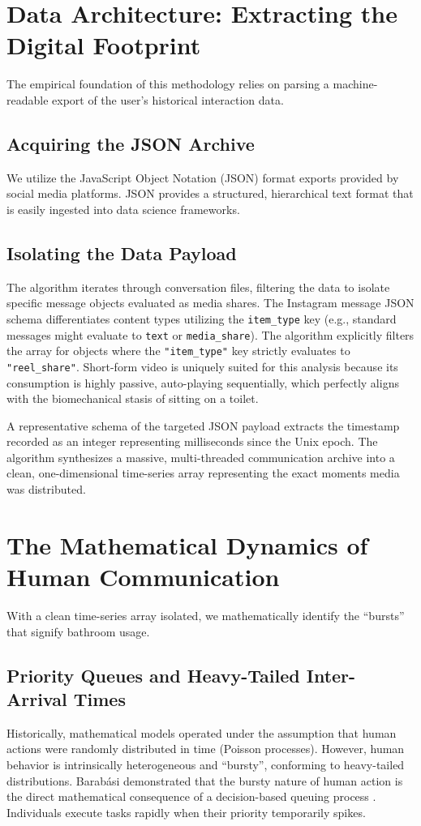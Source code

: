 \documentclass[twocolumn]{article}
\begin{document}
\section{Data Architecture: Extracting the Digital Footprint}
The empirical foundation of this methodology relies on parsing a machine-readable export of the user's historical interaction data.

\subsection{Acquiring the JSON Archive}
We utilize the JavaScript Object Notation (JSON) format exports provided by social media platforms. JSON provides a structured, hierarchical text format that is easily ingested into data science frameworks.

\subsection{Isolating the Data Payload}
The algorithm iterates through conversation files, filtering the data to isolate specific message objects evaluated as media shares. The Instagram message JSON schema differentiates content types utilizing the \texttt{item\_type} key (e.g., standard messages might evaluate to \texttt{text} or \texttt{media\_share}). The algorithm explicitly filters the array for objects where the \texttt{"item\_type"} key strictly evaluates to \texttt{"reel\_share"}. Short-form video is uniquely suited for this analysis because its consumption is highly passive, auto-playing sequentially, which perfectly aligns with the biomechanical stasis of sitting on a toilet.

A representative schema of the targeted JSON payload extracts the timestamp recorded as an integer representing milliseconds since the Unix epoch. The algorithm synthesizes a massive, multi-threaded communication archive into a clean, one-dimensional time-series array representing the exact moments media was distributed.

\section{The Mathematical Dynamics of Human Communication}
With a clean time-series array isolated, we mathematically identify the ``bursts'' that signify bathroom usage.

\subsection{Priority Queues and Heavy-Tailed Inter-Arrival Times}
Historically, mathematical models operated under the assumption that human actions were randomly distributed in time (Poisson processes). However, human behavior is intrinsically heterogeneous and ``bursty'', conforming to heavy-tailed distributions. Barabási demonstrated that the bursty nature of human action is the direct mathematical consequence of a decision-based queuing process \cite{barabasi2005}. Individuals execute tasks rapidly when their priority temporarily spikes.
\end{document}

